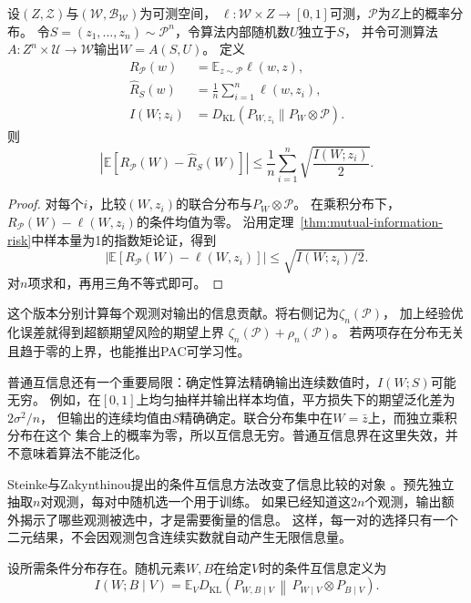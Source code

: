 \begin{theorem}[逐观测互信息的期望风险界]
\label{thm:individual-information-risk}
设$(Z,\mathcal Z)$与$(\mathcal W,\mathcal B_{\mathcal W})$为可测空间，
$\ell:\mathcal W\times Z\to[0,1]$可测，$\mathcal P$为$Z$上的概率分布。
令$S=(z_1,\ldots,z_n)\sim\mathcal P^n$，令算法内部随机数$U$独立于$S$，
并令可测算法$A:Z^n\times\mathcal U\to\mathcal W$输出$W=A(S,U)$。
定义
\[
\begin{aligned}
 R_{\mathcal P}(w)
 &=\mathbb E_{z\sim\mathcal P}\ell(w,z),\\
 \hat R_S(w)
 &=\frac1n\sum_{i=1}^n\ell(w,z_i),\\
 I(W;z_i)
 &=D_{\mathrm{KL}}(P_{W,z_i}\|P_W\otimes\mathcal P).
\end{aligned}
\]
则
\[
 \left|\mathbb E[R_{\mathcal P}(W)-\hat R_S(W)]\right|
 \leq\frac1n\sum_{i=1}^n\sqrt{\frac{I(W;z_i)}2}.
\]
\end{theorem}
\begin{proof}
对每个$i$，比较$(W,z_i)$的联合分布与$P_W\otimes\mathcal P$。
在乘积分布下，$R_{\mathcal P}(W)-\ell(W,z_i)$的条件均值为零。
沿用定理~\ref{thm:mutual-information-risk}中样本量为1的指数矩论证，得到
\[
 \left|\mathbb E[R_{\mathcal P}(W)-\ell(W,z_i)]\right|
 \leq\sqrt{I(W;z_i)/2}.
\]
对$n$项求和，再用三角不等式即可。
\end{proof}

这个版本分别计算每个观测对输出的信息贡献。将右侧记为$\zeta_n(\mathcal P)$，
加上经验优化误差就得到超额期望风险的期望上界
$\zeta_n(\mathcal P)+\rho_n(\mathcal P)$。
若两项存在分布无关且趋于零的上界，也能推出PAC可学习性。

普通互信息还有一个重要局限：确定性算法精确输出连续数值时，$I(W;S)$可能无穷。
例如，在$[0,1]$上均匀抽样并输出样本均值，平方损失下的期望泛化差为$2\sigma^2/n$，
但输出的连续均值由$S$精确确定。联合分布集中在$W=\bar z$上，而独立乘积分布在这个
集合上的概率为零，所以互信息无穷。普通互信息界在这里失效，并不意味着算法不能泛化。

Steinke与Zakynthinou提出的条件互信息方法改变了信息比较的对象
。预先独立抽取$n$对观测，每对中随机选一个用于训练。
如果已经知道这$2n$个观测，输出额外揭示了哪些观测被选中，才是需要衡量的信息。
这样，每一对的选择只有一个二元结果，不会因观测包含连续实数就自动产生无限信息量。

\begin{definition}[条件互信息]
\label{def:stability-conditional-information}
设所需条件分布存在。随机元素$W,B$在给定$V$时的条件互信息定义为
\[
 I(W;B\mid V)
 =\mathbb E_V D_{\mathrm{KL}}\!\left(
 P_{W,B\mid V}\,\middle\|\,P_{W\mid V}\otimes P_{B\mid V}\right).
\]
\end{definition}

